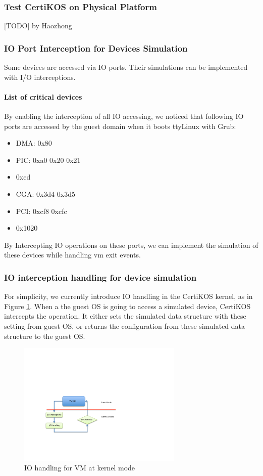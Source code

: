 \documentclass[a4paper,12pt]{article}
\begin{document}
\subsubsection{Test CertiKOS on Physical Platform}
[TODO] by Haozhong
\subsubsection{IO Port Interception for Devices Simulation}
Some devices are accessed via IO ports. Their simulations can be implemented with I/O interceptions.


\paragraph{List of critical devices}
By enabling the interception of all IO accessing,  we noticed that following IO ports are accessed by the guest domain when it boots ttyLinux with Grub:  
\begin{itemize}
\item DMA: 0x80
\item PIC: 0xa0 0x20 0x21
\item 0xed

\item CGA: 0x3d4 0x3d5
\item PCI:  0xcf8 0xcfc
\item 0x1020
\end{itemize}

By Intercepting IO operations on these ports, we can implement the simulation of these devices while handling vm exit events. 

\subsubsection{IO interception  handling for device simulation}


For simplicity, we currently introduce IO handling in the CertiKOS kernel, as  in Figure \ref{fig:iohandling}.  When a the guest OS is going to access a simulated device, CertiKOS intercepts the operation. It either sets the simulated data structure with these setting from guest OS, or returns the configuration from these simulated data structure to the guest OS. 

\begin{figure}[!ht]
 \centerline{
 \includegraphics[width=0.7\textwidth]{IO_handling}}
 \caption{IO handling for VM at kernel mode} \label{fig:iohandling}
\end{figure}
\end{document}
